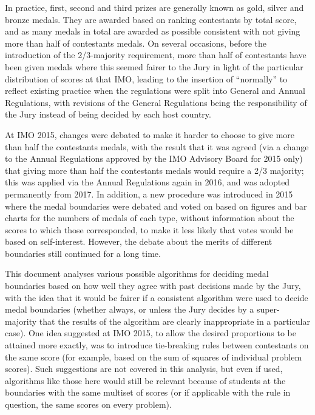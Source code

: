 \documentclass[a4paper,11pt]{article}
\begin{document}
In practice, first, second and third prizes are generally known as
gold, silver and bronze medals.  They are awarded based on ranking
contestants by total score, and as many medals in total are awarded as
possible consistent with not giving more than half of contestants
medals.  On several occasions, before the introduction of the
2/3-majority requirement, more than half of contestants have been
given medals where this seemed fairer to the Jury in light of the
particular distribution of scores at that IMO, leading to the
insertion of ``normally'' to reflect existing practice when the
regulations were split into General and Annual Regulations, with
revisions of the General Regulations being the responsibility of the
Jury instead of being decided by each host country.

At IMO 2015, changes were debated to make it harder to choose to give
more than half the contestants medals, with the result that it was
agreed (via a change to the Annual Regulations approved by the IMO
Advisory Board for 2015 only) that giving more than half the
contestants medals would require a 2/3 majority; this was
applied via the Annual Regulations again in 2016, and was adopted
permanently from 2017.  In addition, a new
procedure was introduced in 2015 where the medal boundaries were debated and
voted on based on figures and bar charts for the numbers of medals of
each type, without information about the scores to which those
corresponded, to make it less likely that votes would be based on
self-interest.  However, the debate about the merits of different
boundaries still continued for a long time.

This document analyses various possible algorithms for deciding medal
boundaries based on how well they agree with past decisions made by
the Jury, with the idea that it would be fairer if a consistent
algorithm were used to decide medal boundaries (whether always, or
unless the Jury decides by a super-majority that the results of the
algorithm are clearly inappropriate in a particular case).  One idea
suggested at IMO 2015, to allow the desired proportions to be attained
more exactly, was to introduce tie-breaking rules between contestants
on the same score (for example, based on the sum of squares of
individual problem scores).  Such suggestions are not covered in this
analysis, but even if used, algorithms like those here would still be
relevant because of students at the boundaries with the same multiset
of scores (or if applicable with the rule in question, the same scores
on every problem).
\end{document}
